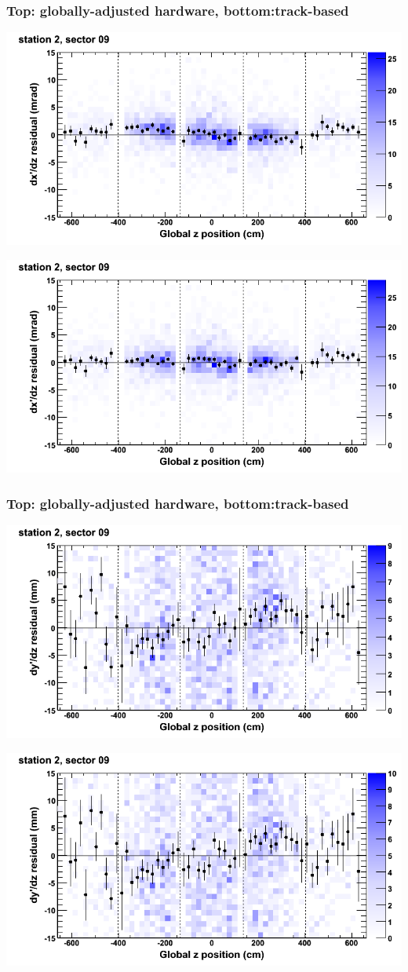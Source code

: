 \documentclass[compress]{beamer}
\begin{document}
\begin{frame}
\frametitle{Top: globally-adjusted hardware, bottom:track-based}
\includegraphics[width=0.7\linewidth]{NOV4_mapplots_HW/DTvsz_st2sec09_dxdz.png}

\includegraphics[width=0.7\linewidth]{NOV4_mapplots/DTvsz_st2sec09_dxdz.png}
\end{frame}

\begin{frame}
\frametitle{Top: globally-adjusted hardware, bottom:track-based}
\includegraphics[width=0.7\linewidth]{NOV4_mapplots_HW/DTvsz_st2sec09_dydz.png}

\includegraphics[width=0.7\linewidth]{NOV4_mapplots/DTvsz_st2sec09_dydz.png}
\end{frame}
\end{document}
